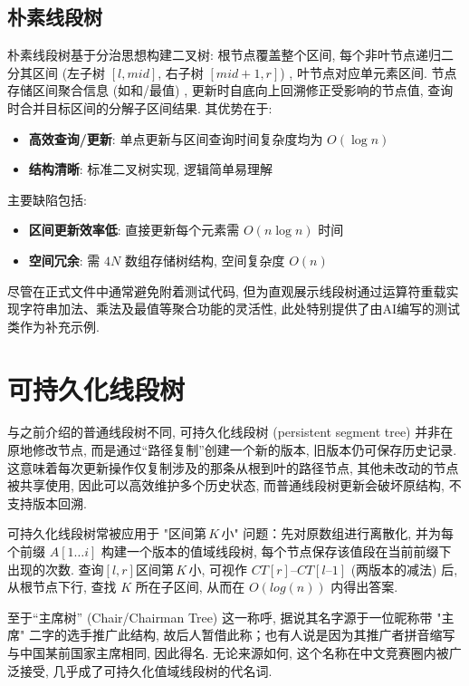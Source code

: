 \documentclass[a4paper]{ctexbook}
\begin{document}
\subsection*{朴素线段树}

朴素线段树基于分治思想构建二叉树: 根节点覆盖整个区间, 每个非叶节点递归二分其区间 (左子树 $[l, mid]$, 右子树 $[mid+1, r]$) , 叶节点对应单元素区间. 节点存储区间聚合信息 (如和/最值) , 更新时自底向上回溯修正受影响的节点值, 查询时合并目标区间的分解子区间结果. 其优势在于: 
\begin{itemize}
	\item \textbf{高效查询/更新}: 单点更新与区间查询时间复杂度均为 $O(\log n)$
	\item \textbf{结构清晰}: 标准二叉树实现, 逻辑简单易理解
\end{itemize}
主要缺陷包括: 
\begin{itemize}
	\item \textbf{区间更新效率低}: 直接更新每个元素需 $O(n \log n)$ 时间
	\item \textbf{空间冗余}: 需 $4N$ 数组存储树结构, 空间复杂度 $O(n)$
\end{itemize}

尽管在正式文件中通常避免附着测试代码, 但为直观展示线段树通过运算符重载实现字符串加法、乘法及最值等聚合功能的灵活性, 此处特别提供了由AI编写的测试类作为补充示例. 



\section*{可持久化线段树}

与之前介绍的普通线段树不同, 可持久化线段树 (persistent segment tree) 并非在原地修改节点, 而是通过“路径复制”创建一个新的版本, 旧版本仍可保存历史记录. 这意味着每次更新操作仅复制涉及的那条从根到叶的路径节点, 其他未改动的节点被共享使用, 因此可以高效维护多个历史状态, 而普通线段树更新会破坏原结构, 不支持版本回溯. 

可持久化线段树常被应用于 "区间第 $K$ 小" 问题：先对原数组进行离散化, 并为每个前缀 $A[1\dots i]$ 构建一个版本的值域线段树, 每个节点保存该值段在当前前缀下出现的次数. 查询$[l,r]$区间第 $K$ 小, 可视作 $CT[r]–CT[l–1]$ (两版本的减法) 后, 从根节点下行, 查找 $K$ 所在子区间, 从而在 $O(log(n))$ 内得出答案. 

至于“主席树” (Chair/Chairman Tree) 这一称呼, 据说其名字源于一位昵称带 "主席" 二字的选手推广此结构, 故后人暂借此称；也有人说是因为其推广者拼音缩写与中国某前国家主席相同, 因此得名. 无论来源如何, 这个名称在中文竞赛圈内被广泛接受, 几乎成了可持久化值域线段树的代名词. 
\end{document}
